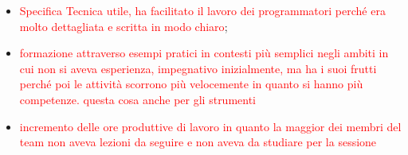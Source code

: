 \begin{itemize}
    \item \textcolor{red}{Specifica Tecnica utile, ha facilitato il lavoro dei programmatori perché era molto dettagliata e scritta in modo chiaro};
    \item \textcolor{red}{formazione attraverso esempi pratici in contesti più semplici negli ambiti in cui non si aveva esperienza, impegnativo inizialmente, ma ha i suoi frutti perché poi le attività scorrono più velocemente in quanto si hanno più competenze. questa cosa anche per gli strumenti}
    \item \textcolor{red}{incremento delle ore produttive di lavoro in quanto la maggior dei membri del team non aveva lezioni da seguire e non aveva da studiare per la sessione}
\end{itemize}